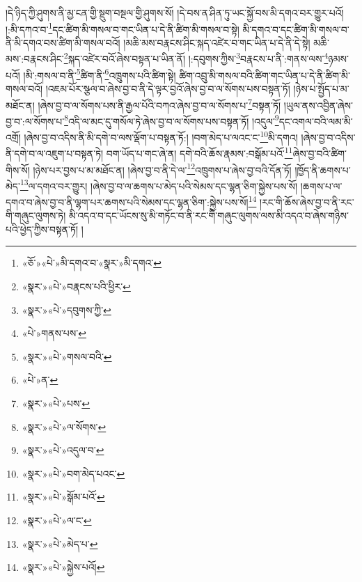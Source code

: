 །དེ་ཉིད་ཀྱི་ཤུགས་ནི་མྱ་ངན་གྱི་སྡུག་བསྔལ་གྱི་ཤུགས་སོ། །དེ་བས་ན་ཤིན་ཏུ་ཡང་སྐྱོ་བས་མི་དགའ་བར་གྱུར་པའོ། །:མི་དཀའ་བ་\footnote{«ཅོ་»«པེ་»མི་དགའ་བ་«སྣར་»མི་དགའ་}དང་ཚིག་མི་གསལ་བ་གང་ཡིན་པ་དེ་ནི་ཚིག་མི་གསལ་བ་སྟེ། མི་དགའ་བ་དང་ཚིག་མི་གསལ་བ་ནི་མི་དགའ་བས་ཚིག་མི་གསལ་བའོ། །མཆི་མས་བརྣངས་ཤིང་སྐད་འཛེར་བ་གང་ཡིན་པ་དེ་ནི་དེ་སྟེ། མཆི་མས་:བརྣངས་ཤིང་\footnote{«སྣར་»«པེ་»བརྣངས་པའི་ཕྱིར་}སྐད་འཛེར་བའོ་ཞེས་བསྟན་པ་ཡིན་ནོ། །:དབུགས་ཀྱིས་\footnote{«སྣར་»«པེ་»དབུགས་ཀྱི་}བརྣངས་པ་ནི་:གནས་ལས་\footnote{«པེ་»གནས་པས་}ཉམས་པའོ། །མི་:གསལ་བ་ནི་\footnote{«སྣར་»«པེ་»གསལ་བའི་}ཚིག་ནི་\footnote{«པེ་»ན་}འཁྲུགས་པའི་ཚིག་སྟེ། ཚིག་འབྲུ་མི་གསལ་བའི་ཚིག་གང་ཡིན་པ་དེ་ནི་ཚིག་མི་གསལ་བའོ། །འཇམ་པོར་སྩལ་བ་ཞེས་བྱ་བ་ནི་དེ་ལྟར་བྱའོ་ཞེས་བྱ་བ་ལ་སོགས་པས་བསྟན་ཏོ། །ཉེས་པ་སྤྱོད་པ་མ་མཐོང་ན། །ཞེས་བྱ་བ་ལ་སོགས་པས་ནི་རྒྱལ་པོའི་བཀའ་ཞེས་བྱ་བ་ལ་སོགས་པ་\footnote{«སྣར་»«པེ་»པས་}བསྟན་ཏོ། །ཡུལ་ནས་འབྱིན་ཞེས་བྱ་བ་:ལ་སོགས་པ་\footnote{«སྣར་»«པེ་»ལ་སོགས་}འདི་ལ་མང་དུ་གསོལ་ཏེ་ཞེས་བྱ་བ་ལ་སོགས་པས་བསྟན་ཏོ། །འདུལ་\footnote{«སྣར་»«པེ་»འདུལ་བ་}དང་འགལ་བའི་ལམ་མི་འགྲོ། །ཞེས་བྱ་བ་འདིས་ནི་མི་དགེ་བ་ལས་ལྡོག་པ་བསྟན་ཏོ:། །བག་མེད་པ་ལའང་ང་\footnote{«སྣར་»«པེ་»བག་མེད་པའང་}མི་དགའ། །ཞེས་བྱ་བ་འདིས་ནི་དགེ་བ་ལ་འཇུག་པ་བསྟན་ཏེ། བག་ཡོད་པ་གང་ཞེ་ན། དགེ་བའི་ཆོས་རྣམས་:བསྒོམ་པའོ་\footnote{«སྣར་»«པེ་»སྒོམ་པའོ་}ཞེས་བྱ་བའི་ཚིག་གིས་སོ། །ཉེས་པར་བྱས་པ་མ་མཐོང་ན། །ཞེས་བྱ་བ་ནི་དེ་ལ་\footnote{«སྣར་»«པེ་»ལ་ང་}འཁྲུགས་པ་ཞེས་བྱ་བའི་དོན་ཏོ། །ཁྱོད་ནི་ཆགས་པ་མེད་\footnote{«སྣར་»«པེ་»མེད་པ་}ལ་དགའ་བར་གྱུར། །ཞེས་བྱ་བ་ལ་ཆགས་པ་མེད་པའི་སེམས་དང་ལྷན་ཅིག་སྐྱེས་པས་སོ། །ཆགས་པ་ལ་དགའ་བ་ཞེས་བྱ་བ་ནི་ལྷག་པར་ཆགས་པའི་སེམས་དང་ལྷན་ཅིག་:སྐྱེས་པས་སོ།\footnote{«སྣར་»«པེ་»སྐྱེས་པའོ།} །རང་གི་ཆོས་ཞེས་བྱ་བ་ནི་རང་གི་གཞུང་ལུགས་ཏེ། མི་འདའ་བ་དང་ཡོངས་སུ་མི་གཏོང་བ་ནི་རང་གི་གཞུང་ལུགས་ལས་མི་འདའ་བ་ཞེས་གཉིས་པའི་ཕྱེད་ཀྱིས་བསྟན་ཏོ། །
